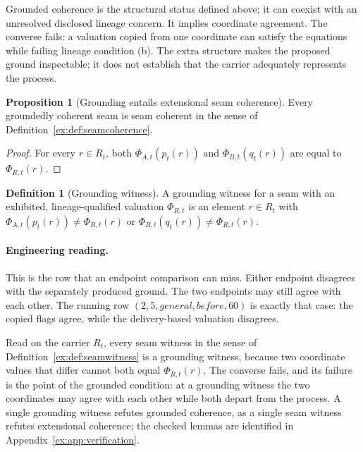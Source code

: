 \documentclass[11pt]{article}
\theoremstyle{definition}
\newtheorem{definition}{Definition}[section]
\newtheorem{proposition}{Proposition}[section]
\begin{document}
Grounded coherence is the structural status defined above; it can coexist with an unresolved disclosed lineage concern. It implies coordinate agreement. The converse fails: a valuation copied from one coordinate can satisfy the equations while failing lineage condition (b). The extra structure makes the proposed ground inspectable; it does not establish that the carrier adequately represents the process.

\begin{proposition}[Grounding entails extensional seam coherence]\label{ex:prop:grounding-entails-coherence}
Every groundedly coherent seam is seam coherent in the sense of Definition~\ref{ex:def:seamcoherence}.
\end{proposition}

\begin{proof}
For every $r\in R_t$, both
$\Phi_{A,t}(p_t(r))$ and
$\Phi_{B,t}(q_t(r))$ are equal to
$\Phi_{R,t}(r)$.
\end{proof}

\begin{definition}[Grounding witness]\label{ex:def:grounding-witness}
A grounding witness for a seam with an exhibited, lineage-qualified valuation $\Phi_{R,t}$ is an element $r\in R_t$ with $\Phi_{A,t}(p_t(r))\neq\Phi_{R,t}(r)$ or $\Phi_{B,t}(q_t(r))\neq\Phi_{R,t}(r)$.
\end{definition}

\paragraph{Engineering reading.} This is the row that an endpoint comparison can miss. Either endpoint disagrees with the separately produced ground. The two endpoints may still agree with each other. The running row $(2,5,\mathit{general},\mathit{before},60)$ is exactly that case: the copied flags agree, while the delivery-based valuation disagrees.

Read on the carrier $R_t$, every seam witness in the sense of Definition~\ref{ex:def:seamwitness} is a grounding witness, because two coordinate values that differ cannot both equal $\Phi_{R,t}(r)$. The converse fails, and its failure is the point of the grounded condition: at a grounding witness the two coordinates may agree with each other while both depart from the process. A single grounding witness refutes grounded coherence, as a single seam witness refutes extensional coherence; the checked lemmas are identified in Appendix~\ref{ex:app:verification}.
\end{document}
